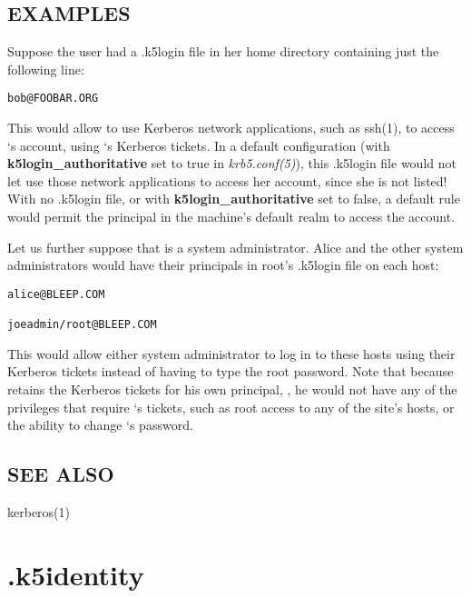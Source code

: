 \documentclass[letterpaper,10pt,english]{sphinxmanual}
\begin{document}
\subsection{EXAMPLES}
\label{user/user_config/k5login:examples}
Suppose the user  had a .k5login file in her home directory
containing just the following line:

\begin{Verbatim}[commandchars=\\\{\}]
bob@FOOBAR.ORG
\end{Verbatim}

This would allow  to use Kerberos network applications, such as
ssh(1), to access `s account, using `s Kerberos
tickets.  In a default configuration (with \textbf{k5login\_authoritative} set
to true in \emph{krb5.conf(5)}), this .k5login file would not let
 use those network applications to access her account, since
she is not listed!  With no .k5login file, or with \textbf{k5login\_authoritative}
set to false, a default rule would permit the principal  in the
machine's default realm to access the  account.

Let us further suppose that  is a system administrator.
Alice and the other system administrators would have their principals
in root's .k5login file on each host:

\begin{Verbatim}[commandchars=\\\{\}]
alice@BLEEP.COM

joeadmin/root@BLEEP.COM
\end{Verbatim}

This would allow either system administrator to log in to these hosts
using their Kerberos tickets instead of having to type the root
password.  Note that because  retains the Kerberos tickets for
his own principal, , he would not have any of the
privileges that require `s tickets, such as root access to
any of the site's hosts, or the ability to change `s
password.


\subsection{SEE ALSO}
\label{user/user_config/k5login:see-also}
kerberos(1)


\section{.k5identity}
\label{user/user_config/k5identity:k5identity-5}\label{user/user_config/k5identity:k5identity}\label{user/user_config/k5identity::doc}
\end{document}
